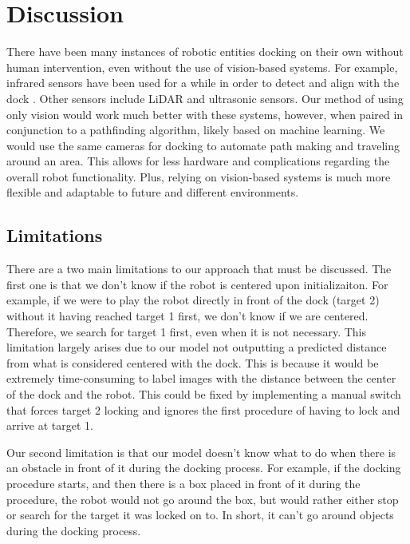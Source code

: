 \section{Discussion}
There have been many instances of robotic entities docking on their own without human intervention, even without the use of vision-based systems. For example, infrared sensors have been used for a while in order to detect and align with the dock \citep{quilez:hal-01147332}. Other sensors include LiDAR and ultrasonic sensors. Our method of using only vision would work much better with these systems, however, when paired in conjunction to a pathfinding algorithm, likely based on machine learning. We would use the same cameras for docking to automate path making and traveling around an area. This allows for less hardware and complications regarding the overall robot functionality. Plus, relying on vision-based systems is much more flexible and adaptable to future and different environments.
\subsection{Limitations}
There are a two main limitations to our approach that must be discussed. The first one is that we don't know if the robot is centered upon initializaiton. For example, if we were to play the robot directly in front of the dock (target 2) without it having reached target 1 first, we don't know if we are centered. Therefore, we search for target 1 first, even when it is not necessary. This limitation largely arises due to our model not outputting a predicted distance from what is considered centered with the dock. This is because it would be extremely time-consuming to label images with the distance between the center of the dock and the robot. This could be fixed by implementing a manual switch that forces target 2 locking and ignores the first procedure of having to lock and arrive at target 1.

Our second limitation is that our model doesn't know what to do when there is an obstacle in front of it during the docking process. For example, if the docking procedure starts, and then there is a box placed in front of it during the procedure, the robot would not go around the box, but would rather either stop or search for the target it was locked on to. In short, it can't go around objects during the docking process.

